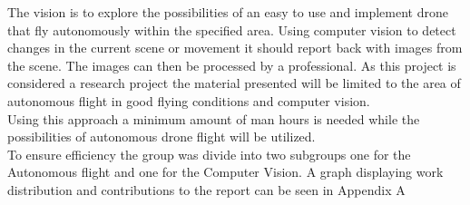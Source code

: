 The vision is to explore the possibilities of an easy to use and implement drone that fly autonomously within the specified area. Using computer vision to detect changes in the current scene or movement it should report back with images from the scene. The images can then be processed by a professional. As this project is considered a research project the material presented will be limited to the area of autonomous flight in good flying conditions and computer vision.\\ 
Using this approach a minimum amount of man hours is needed while the possibilities of autonomous drone flight will be utilized.\\
To ensure efficiency the group was divide into two subgroups one for the Autonomous flight and one for the Computer Vision. A graph displaying work distribution and contributions to the report can be seen in Appendix A
